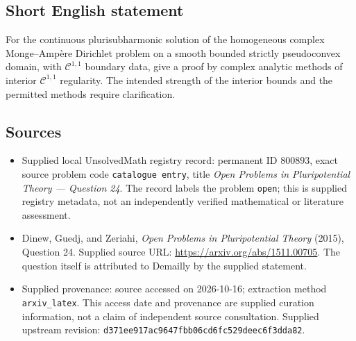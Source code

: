 \documentclass[11pt]{article}
\begin{document}
\subsection{Short English statement}
For the continuous plurisubharmonic solution of the homogeneous complex Monge--Amp\`ere Dirichlet problem on a smooth bounded strictly pseudoconvex domain, with \(\mathcal C^{1,1}\) boundary data, give a proof by complex analytic methods of interior \(\mathcal C^{1,1}\) regularity. The intended strength of the interior bounds and the permitted methods require clarification.
\subsection{Sources}
\begin{itemize}
\item Supplied local UnsolvedMath registry record: permanent ID \(800893\), exact source problem code \texttt{catalogue entry}, title \emph{Open Problems in Pluripotential Theory --- Question 24}. The record labels the problem \texttt{open}; this is supplied registry metadata, not an independently verified mathematical or literature assessment.
\item Dinew, Guedj, and Zeriahi, \emph{Open Problems in Pluripotential Theory} (2015), Question 24. Supplied source URL: \url{https://arxiv.org/abs/1511.00705}. The question itself is attributed to Demailly by the supplied statement.
\item Supplied provenance: source accessed on 2026-10-16; extraction method \texttt{arxiv\_latex}. This access date and provenance are supplied curation information, not a claim of independent source consultation. Supplied upstream revision: \texttt{d371ee917ac9647fbb06cd6fc529deec6f3dda82}.
\end{itemize}
\end{document}
